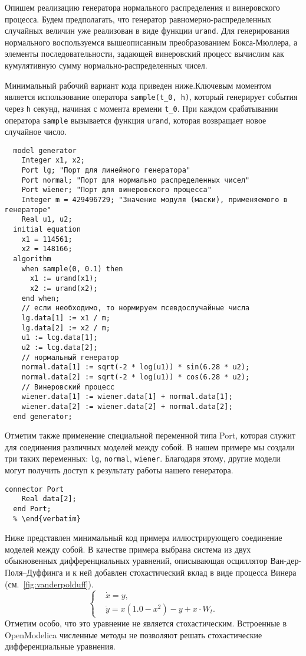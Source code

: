 \documentclass[%
floatfix,
showkeys,
nofootinbib, %
superscriptaddress, %
]{revtex4-1}
\begin{document}
Опишем реализацию генератора нормального распределения и винеровского
процесса. Будем предполагать, что генератор равномерно-распределенных
случайных величин уже реализован в виде функции \verb|urand|. Для
генерирования нормального воспользуемся вышеописанным преобразованием
Бокса-Мюллера, а элементы последовательности, задающей винеровский
процесс вычислим как кумулятивную сумму нормально-распределенных
чисел.

Минимальный рабочий вариант кода приведен ниже.Ключевым моментом
является использование оператора \verb|sample(t_0, h)|, который
генерирует события через \verb|h| секунд, начиная с момента времени
\verb|t_0|. При каждом срабатывании оператора \verb|sample| вызывается
функция \verb|urand|, которая возвращает новое случайное число.

\begin{verbatim}
  model generator
    Integer x1, x2;
    Port lg; "Порт для линейного генератора"
    Port normal; "Порт для нормально распределенных чисел"
    Port wiener; "Порт для винеровского процесса"
    Integer m = 429496729; "Значение модуля (маски), применяемого в генераторе"
    Real u1, u2;
  initial equation
    x1 = 114561;
    x2 = 148166;
  algorithm
    when sample(0, 0.1) then
      x1 := urand(x1);
      x2 := urand(x2);
    end when;
    // если необходимо, то нормируем псевдослучайные числа
    lg.data[1] := x1 / m;
    lg.data[2] := x2 / m;
    u1 := lcg.data[1];
    u2 := lcg.data[2];
    // нормальный генератор
    normal.data[1] := sqrt(-2 * log(u1)) * sin(6.28 * u2);
    normal.data[2] := sqrt(-2 * log(u1)) * cos(6.28 * u2);
    // Винеровский процесс
    wiener.data[1] := wiener.data[1] + normal.data[1];
    wiener.data[2] := wiener.data[2] + normal.data[2];
  end generator;
\end{verbatim}

Отметим также применение специальной переменной типа Port, которая
служит для соединения различных моделей между собой. В нашем примере
мы создали три таких переменных: \verb|lg|, \verb|normal|,
\verb|wiener|. Благодаря этому, другие модели могут получить доступ к
результату работы нашего генератора.

\begin{lstlisting}[language=modelica]
  connector Port
    Real data[2];
  end Port;
  % \end{verbatim}
\end{lstlisting}

Ниже представлен минимальный код примера иллюстрирующего соединение
моделей между собой. В качестве примера выбрана система из двух
обыкновенных дифференциальных уравнений, описывающая осциллятор
Ван-дер-Поля–Дуффинга и к ней добавлен стохастический вклад в виде
процесса Винера (см.~\ref{fig:vanderpolduff}).
\[
  \left\{
  \begin{aligned}
    & \dot{x} = y,\\
    & \dot{y} = x(1.0 - x^{2}) - y + x\cdot W_{t}.
  \end{aligned}
  \right.
\]
Отметим особо, что это уравнение не является
стохастическим. Встроенные в OpenModelica численные методы не
позволяют решать стохастические дифференциальные уравнения.
\end{document}
